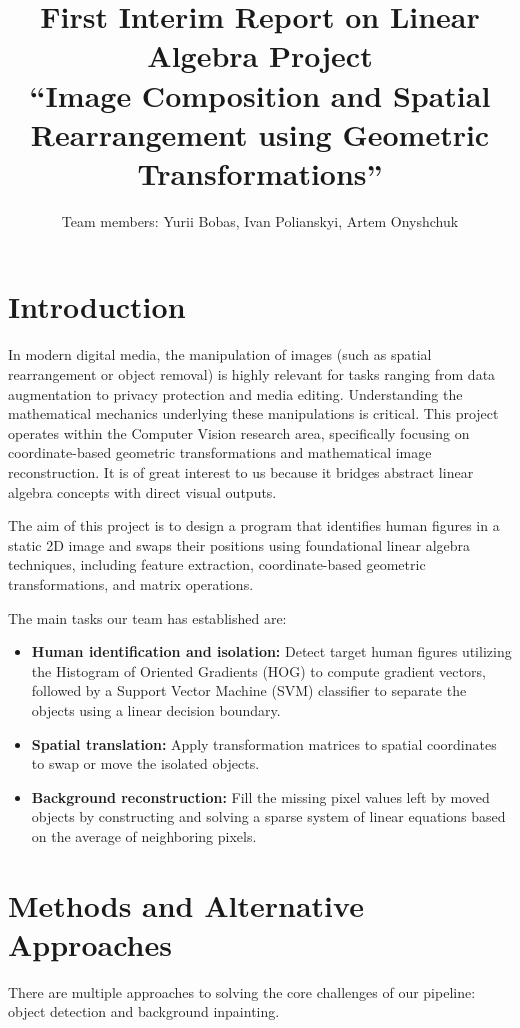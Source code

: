 \documentclass[12pt]{article}
\title{First Interim Report on Linear Algebra Project \\
\large ``Image Composition and Spatial Rearrangement using Geometric Transformations''}
\author{Team members: Yurii Bobas, Ivan Polianskyi, Artem Onyshchuk}
\date{}
\begin{document}
\maketitle

\section{Introduction}
In modern digital media, the manipulation of images (such as spatial rearrangement or object removal) is highly relevant for tasks ranging from data augmentation to privacy protection and media editing. Understanding the mathematical mechanics underlying these manipulations is critical. This project operates within the Computer Vision research area, specifically focusing on coordinate-based geometric transformations and mathematical image reconstruction. It is of great interest to us because it bridges abstract linear algebra concepts with direct visual outputs.

The aim of this project is to design a program that identifies human figures in a static 2D image and swaps their positions using foundational linear algebra techniques, including feature extraction, coordinate-based geometric transformations, and matrix operations.

The main tasks our team has established are:
\begin{itemize}
    \item \textbf{Human identification and isolation:} Detect target human figures utilizing the Histogram of Oriented Gradients (HOG) to compute gradient vectors, followed by a Support Vector Machine (SVM) classifier to separate the objects using a linear decision boundary.
    \item \textbf{Spatial translation:} Apply transformation matrices to spatial coordinates to swap or move the isolated objects.
    \item \textbf{Background reconstruction:} Fill the missing pixel values left by moved objects by constructing and solving a sparse system of linear equations based on the average of neighboring pixels.
\end{itemize}

\section{Methods and Alternative Approaches}
There are multiple approaches to solving the core challenges of our pipeline: object detection and background inpainting.
\end{document}
